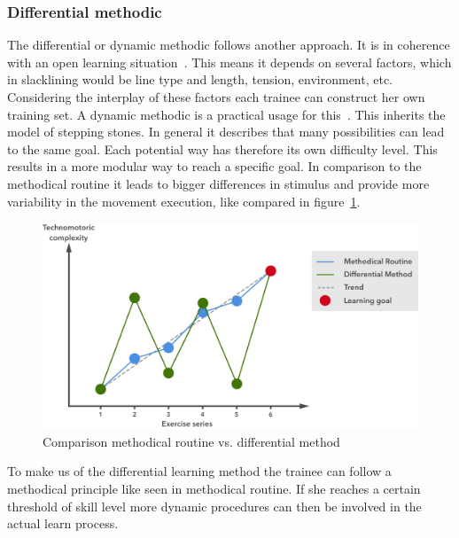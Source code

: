 \subsubsection{Differential methodic}
The differential or dynamic methodic follows another approach. It is in coherence with an open learning situation~\cite{Thomann2013-aa}. This means it depends on several factors, which in slacklining would be line type and length, tension, environment, etc. Considering the interplay of these factors each trainee can construct her own training set.
A dynamic methodic is a practical usage for this~\cite{Beck2008-dl, Schoellhorn1999-ip}. This inherits the model of stepping stones. In general it describes that many possibilities can lead to the same goal. Each potential way has therefore its own difficulty level. This results in a more modular way to reach a specific goal. In comparison to the methodical routine it leads to bigger differences in stimulus and provide more variability in the movement execution, like compared in figure~\ref{fig:3_3_1_comparisonMethods}. 

\begin{figure}[htb]
	\centering
	\begin{minipage}[t]{1\linewidth}
		\centering
		\includegraphics[width=0.83\linewidth]{Pictures/3_3_1_comparisonMethod2}
		\caption{Comparison methodical routine vs. differential method~\cite{Thomann2013-aa}}
		\label{fig:3_3_1_comparisonMethods}
	\end{minipage}
\end{figure}
To make us of the differential learning method the trainee can follow a methodical principle like seen in methodical routine. If she reaches a certain threshold of skill level more dynamic procedures can then be involved in the actual learn process. %

